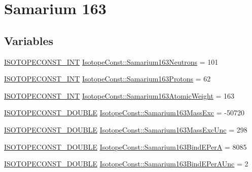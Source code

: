 \hypertarget{group___isotope_const-_samarium-_sm163}{}\section{Samarium 163}
\label{group___isotope_const-_samarium-_sm163}
\subsection*{Variables}
\begin{DoxyCompactItemize}
\item 
\mbox{\hyperlink{group___isotope_const-_macros_ga5f18360b3e99483a35c32d789e62621c}{I\+S\+O\+T\+O\+P\+E\+C\+O\+N\+S\+T\+\_\+\+I\+NT}} \mbox{\hyperlink{group___isotope_const-_samarium-_sm163_ga76bc4f0c5a3116f067705d71543f16dc}{Isotope\+Const\+::\+Samarium163\+Neutrons}} = 101
\item 
\mbox{\hyperlink{group___isotope_const-_macros_ga5f18360b3e99483a35c32d789e62621c}{I\+S\+O\+T\+O\+P\+E\+C\+O\+N\+S\+T\+\_\+\+I\+NT}} \mbox{\hyperlink{group___isotope_const-_samarium-_sm163_gacbe137b7e8a69995b567d79e406d5e3d}{Isotope\+Const\+::\+Samarium163\+Protons}} = 62
\item 
\mbox{\hyperlink{group___isotope_const-_macros_ga5f18360b3e99483a35c32d789e62621c}{I\+S\+O\+T\+O\+P\+E\+C\+O\+N\+S\+T\+\_\+\+I\+NT}} \mbox{\hyperlink{group___isotope_const-_samarium-_sm163_ga2880865bf713dde06718f5cb3568192f}{Isotope\+Const\+::\+Samarium163\+Atomic\+Weight}} = 163
\item 
\mbox{\hyperlink{group___isotope_const-_macros_ga8f45a7272ce02c0b4c65c44636ed719a}{I\+S\+O\+T\+O\+P\+E\+C\+O\+N\+S\+T\+\_\+\+D\+O\+U\+B\+LE}} \mbox{\hyperlink{group___isotope_const-_samarium-_sm163_gad37d6252beb81893bade9126e608fb08}{Isotope\+Const\+::\+Samarium163\+Mass\+Exc}} = -\/50720
\item 
\mbox{\hyperlink{group___isotope_const-_macros_ga8f45a7272ce02c0b4c65c44636ed719a}{I\+S\+O\+T\+O\+P\+E\+C\+O\+N\+S\+T\+\_\+\+D\+O\+U\+B\+LE}} \mbox{\hyperlink{group___isotope_const-_samarium-_sm163_ga977d0ce17c2e2aaa7dd23b0525e8ae54}{Isotope\+Const\+::\+Samarium163\+Mass\+Exc\+Unc}} = 298
\item 
\mbox{\hyperlink{group___isotope_const-_macros_ga8f45a7272ce02c0b4c65c44636ed719a}{I\+S\+O\+T\+O\+P\+E\+C\+O\+N\+S\+T\+\_\+\+D\+O\+U\+B\+LE}} \mbox{\hyperlink{group___isotope_const-_samarium-_sm163_ga1920dcd69a73145933c250ae098e5e3f}{Isotope\+Const\+::\+Samarium163\+Bind\+E\+PerA}} = 8085
\item 
\mbox{\hyperlink{group___isotope_const-_macros_ga8f45a7272ce02c0b4c65c44636ed719a}{I\+S\+O\+T\+O\+P\+E\+C\+O\+N\+S\+T\+\_\+\+D\+O\+U\+B\+LE}} \mbox{\hyperlink{group___isotope_const-_samarium-_sm163_ga995bee7afaac30fc0ec05fce802ea238}{Isotope\+Const\+::\+Samarium163\+Bind\+E\+Per\+A\+Unc}} = 2

\end{DoxyCompactItemize}
